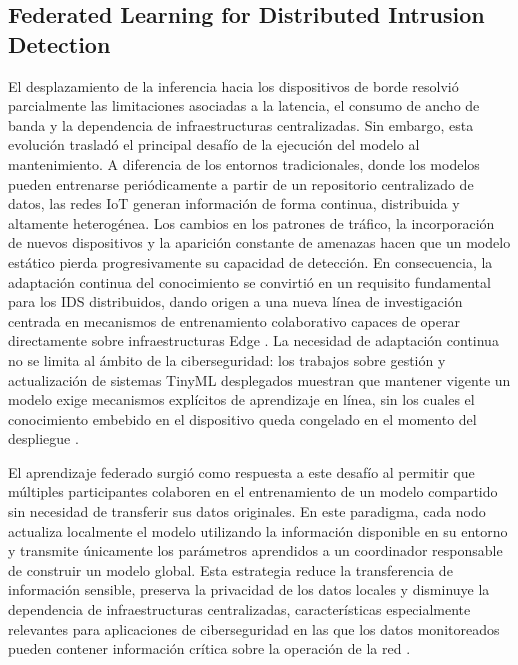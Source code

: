 \documentclass[journal,article,submit,moreauthors]{Definitions/mdpi}
\begin{document}
\subsection{Federated Learning for Distributed Intrusion Detection}
El desplazamiento de la inferencia hacia los dispositivos de borde resolvió parcialmente las limitaciones asociadas a la latencia, el consumo de ancho de banda y la dependencia de infraestructuras centralizadas. Sin embargo, esta evolución trasladó el principal desafío de la ejecución del modelo al mantenimiento. A diferencia de los entornos tradicionales, donde los modelos pueden entrenarse periódicamente a partir de un repositorio centralizado de datos, las redes IoT generan información de forma continua, distribuida y altamente heterogénea. Los cambios en los patrones de tráfico, la incorporación de nuevos dispositivos y la aparición constante de amenazas hacen que un modelo estático pierda progresivamente su capacidad de detección. En consecuencia, la adaptación continua del conocimiento se convirtió en un requisito fundamental para los IDS distribuidos, dando origen a una nueva línea de investigación centrada en mecanismos de entrenamiento colaborativo capaces de operar directamente sobre infraestructuras Edge \cite{McMahan2017,Imteaj2022,Ramadan2025}. La necesidad de adaptación continua no se limita al ámbito de la ciberseguridad: los trabajos sobre gestión y actualización de sistemas TinyML desplegados muestran que mantener vigente un modelo exige mecanismos explícitos de aprendizaje en línea, sin los cuales el conocimiento embebido en el dispositivo queda congelado en el momento del despliegue \cite{Ren2024}.

El aprendizaje federado surgió como respuesta a este desafío al permitir que múltiples participantes colaboren en el entrenamiento de un modelo compartido sin necesidad de transferir sus datos originales. En este paradigma, cada nodo actualiza localmente el modelo utilizando la información disponible en su entorno y transmite únicamente los parámetros aprendidos a un coordinador responsable de construir un modelo global. Esta estrategia reduce la transferencia de información sensible, preserva la privacidad de los datos locales y disminuye la dependencia de infraestructuras centralizadas, características especialmente relevantes para aplicaciones de ciberseguridad en las que los datos monitoreados pueden contener información crítica sobre la operación de la red \cite{McMahan2017,Imteaj2022,Hajj2023,Roy2023}.
\end{document}
